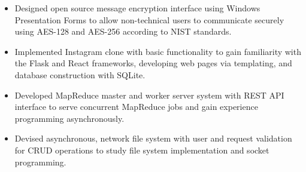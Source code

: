 \documentclass[overlapped]{res}
\begin{document}
\begin{resume}


                  \begin{itemize}  \itemsep -2pt %
                    \item Designed open source message encryption interface using
                    Windows Presentation Forms to allow non-technical users
                    to communicate securely using AES-128 and AES-256
                    according to NIST standards.
                    \item Implemented Instagram clone with basic functionality 
                    to gain familiarity with the Flask and React frameworks, 
                    developing web pages via templating, 
                    and database construction with SQLite.
                    \item Developed MapReduce master and worker server system 
                    with REST API interface to serve concurrent MapReduce jobs
                    and gain experience programming asynchronously.
                    \item Devised asynchronous, network file system with user and request
                    validation for CRUD operations to study file system implementation
                    and socket programming.
                  \end{itemize}



\end{resume}
\end{document}
